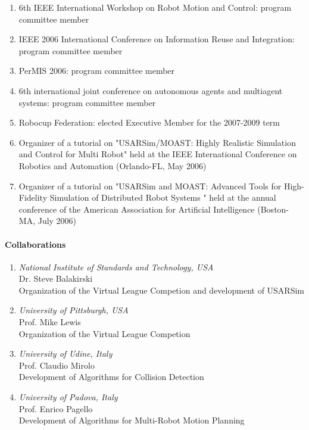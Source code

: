 \begin{enumerate}
    \item 6th IEEE International Workshop on Robot Motion and  Control: program committee
          member
   \item IEEE 2006 International Conference  on Information Reuse  and
Integration: program committee member
\item PerMIS 2006: program committee member
   \item 6th international joint conference on autonomous agents and multiagent
          systems: program committee member
\item Robocup Federation: elected Executive Member for the 2007-2009 term
\item Organizer of  a tutorial on "USARSim/MOAST: Highly Realistic Simulation and Control for Multi Robot" held at the IEEE International
Conference on Robotics and Automation (Orlando-FL, May 2006)
\item Organizer of a tutorial on "USARSim and MOAST: Advanced Tools for High-Fidelity Simulation of Distributed Robot Systems "   held at the annual conference
of the American Association for Artificial Intelligence  (Boston-MA, July 2006)
\end{enumerate}

\paragraph{Collaborations}
\begin{enumerate}
    \item {\sl National Institute of Standards and Technology, USA}\\
          Dr. Steve Balakirski\\
          Organization of the Virtual League Competion and development of USARSim
    \item {\sl University of Pittsburgh, USA}\\
          Prof. Mike Lewis\\
          Organization of the Virtual League Competion
    \item {\sl University of Udine, Italy}\\
          Prof. Claudio Mirolo\\
          Development of Algorithms for Collision Detection
    \item {\sl University  of Padova, Italy}\\
          Prof. Enrico Pagello\\
          Development of Algorithms for Multi-Robot Motion Planning
\end{enumerate}



